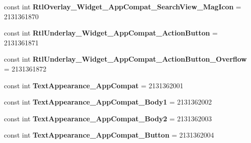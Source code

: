\begin{DoxyCompactItemize}
\item 
\mbox{\label{class_sample_app_1_1_droid_1_1_resource_1_1_style_afe2579e830dd783c0f8ae47ab5949767}} 
const int {\bfseries Rtl\+Overlay\+\_\+\+Widget\+\_\+\+App\+Compat\+\_\+\+Search\+View\+\_\+\+Mag\+Icon} = 2131361870
\item 
\mbox{\label{class_sample_app_1_1_droid_1_1_resource_1_1_style_a9921706c45d9a564ad685c7fce65f2e7}} 
const int {\bfseries Rtl\+Underlay\+\_\+\+Widget\+\_\+\+App\+Compat\+\_\+\+Action\+Button} = 2131361871
\item 
\mbox{\label{class_sample_app_1_1_droid_1_1_resource_1_1_style_a303064a7cdd9047aa9d3aa875cd76c33}} 
const int {\bfseries Rtl\+Underlay\+\_\+\+Widget\+\_\+\+App\+Compat\+\_\+\+Action\+Button\+\_\+\+Overflow} = 2131361872
\item 
\mbox{\label{class_sample_app_1_1_droid_1_1_resource_1_1_style_a59fc50416a00d6c701d3ce12ff834e7d}} 
const int {\bfseries Text\+Appearance\+\_\+\+App\+Compat} = 2131362001
\item 
\mbox{\label{class_sample_app_1_1_droid_1_1_resource_1_1_style_acf094f69103656eed1bd16e061019675}} 
const int {\bfseries Text\+Appearance\+\_\+\+App\+Compat\+\_\+\+Body1} = 2131362002
\item 
\mbox{\label{class_sample_app_1_1_droid_1_1_resource_1_1_style_ae630225194d0593e416a51ddf9f99bf0}} 
const int {\bfseries Text\+Appearance\+\_\+\+App\+Compat\+\_\+\+Body2} = 2131362003
\item 
\mbox{\label{class_sample_app_1_1_droid_1_1_resource_1_1_style_a34e2501c712657ff1c1e4654e6d76a91}} 
const int {\bfseries Text\+Appearance\+\_\+\+App\+Compat\+\_\+\+Button} = 2131362004
\item 
\mbox{\label{class_sample_app_1_1_droid_1_1_resource_1_1_style_a4dfda3b807a6583761db5e73a665ad03}} 

\end{DoxyCompactItemize}
